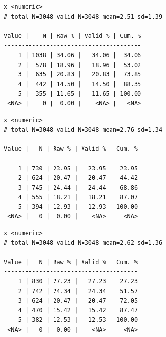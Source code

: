 \documentclass[
  letterpaper,
  DIV=11,
  numbers=noendperiod]{scrreprt}
\newenvironment{Shaded}{\begin{snugshade}}{\end{snugshade}}
\newcommand{\AttributeTok}[1]{\textcolor[rgb]{0.40,0.45,0.13}{#1}}
\newcommand{\FunctionTok}[1]{\textcolor[rgb]{0.28,0.35,0.67}{#1}}
\newcommand{\NormalTok}[1]{\textcolor[rgb]{0.00,0.23,0.31}{#1}}
\newcommand{\OtherTok}[1]{\textcolor[rgb]{0.00,0.23,0.31}{#1}}
\newcommand{\SpecialCharTok}[1]{\textcolor[rgb]{0.37,0.37,0.37}{#1}}
\begin{document}
\begin{verbatim}
x <numeric> 
# total N=3048 valid N=3048 mean=2.51 sd=1.39

Value |    N | Raw % | Valid % | Cum. %
---------------------------------------
    1 | 1038 | 34.06 |   34.06 |  34.06
    2 |  578 | 18.96 |   18.96 |  53.02
    3 |  635 | 20.83 |   20.83 |  73.85
    4 |  442 | 14.50 |   14.50 |  88.35
    5 |  355 | 11.65 |   11.65 | 100.00
 <NA> |    0 |  0.00 |    <NA> |   <NA>
\end{verbatim}

\begin{Shaded}
\end{Shaded}

\begin{verbatim}
x <numeric> 
# total N=3048 valid N=3048 mean=2.76 sd=1.34

Value |   N | Raw % | Valid % | Cum. %
--------------------------------------
    1 | 730 | 23.95 |   23.95 |  23.95
    2 | 624 | 20.47 |   20.47 |  44.42
    3 | 745 | 24.44 |   24.44 |  68.86
    4 | 555 | 18.21 |   18.21 |  87.07
    5 | 394 | 12.93 |   12.93 | 100.00
 <NA> |   0 |  0.00 |    <NA> |   <NA>
\end{verbatim}

\begin{Shaded}
\end{Shaded}

\begin{verbatim}
x <numeric> 
# total N=3048 valid N=3048 mean=2.62 sd=1.36

Value |   N | Raw % | Valid % | Cum. %
--------------------------------------
    1 | 830 | 27.23 |   27.23 |  27.23
    2 | 742 | 24.34 |   24.34 |  51.57
    3 | 624 | 20.47 |   20.47 |  72.05
    4 | 470 | 15.42 |   15.42 |  87.47
    5 | 382 | 12.53 |   12.53 | 100.00
 <NA> |   0 |  0.00 |    <NA> |   <NA>
\end{verbatim}

\begin{Shaded}
\end{Shaded}
\end{document}
